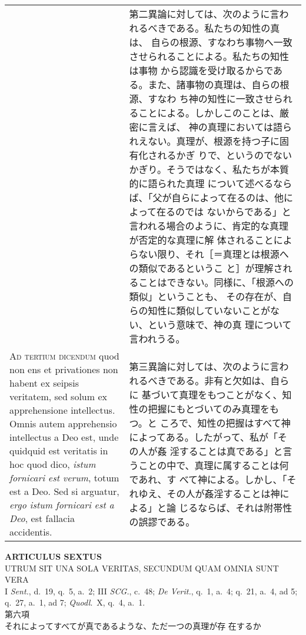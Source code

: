 \documentclass[10pt]{jsarticle} %
\begin{document}
\begin{longtable}{p{21em}p{21em}}
&

第二異論に対しては、次のように言われるべきである。私たちの知性の真は、
自らの根源、すなわち事物へ一致させられることによる。私たちの知性は事物
から認識を受け取るからである。また、諸事物の真理は、自らの根源、すなわ
ち神の知性に一致させられることによる。しかしこのことは、厳密に言えば、
神の真理においては語られえない。真理が、根源を持つ子に固有化されるかぎ
りで、というのでないかぎり。そうではなく、私たちが本質的に語られた真理
について述べるならば、「父が自らによって在るのは、他によって在るのでは
ないからである」と言われる場合のように、肯定的な真理が否定的な真理に解
体されることによらない限り、それ［＝真理とは根源への類似であるというこ
と］が理解されることはできない。同様に、「根源への類似」ということも、
その存在が、自らの知性に類似していないことがない、という意味で、神の真
理について言われうる。

\\

{\scshape Ad tertium dicendum} quod non ens et privationes non habent
ex seipsis veritatem, sed solum ex apprehensione intellectus. Omnis
autem apprehensio intellectus a Deo est, unde quidquid est veritatis
in hoc quod dico, {\itshape istum fornicari est verum}, totum est a
Deo. Sed si arguatur, {\itshape ergo istum fornicari est a Deo}, est
fallacia accidentis.


&

第三異論に対しては、次のように言われるべきである。非有と欠如は、自らに
基づいて真理をもつことがなく、知性の把握にもとづいてのみ真理をもつ。と
ころで、知性の把握はすべて神によってある。したがって、私が「その人が姦
淫することは真である」と言うことの中で、真理に属することは何であれ、す
べて神による。しかし、「それゆえ、その人が姦淫することは神による」と論
じるならば、それは附帯性の誤謬である。

\end{longtable}
\newpage


\begin{center}
 {\Large {\bf ARTICULUS SEXTUS}}\\
 {\large UTRUM SIT UNA SOLA VERITAS, SECUNDUM QUAM OMNIA SUNT VERA}\\
 {\footnotesize I {\itshape Sent.}, d.~19, q.~5, a.~2; III {\itshape
 SCG.}, c.~48; {\itshape De Verit.}, q.~1, a.~4; q.~21, a.~4, ad 5;
 q.~27, a.~1, ad 7; {\itshape Quodl}.~X, q.~4, a.~1.}\\
 {\Large 第六項\\それによってすべてが真であるような、ただ一つの真理が存
 在するか}
\end{center}
\end{document}
